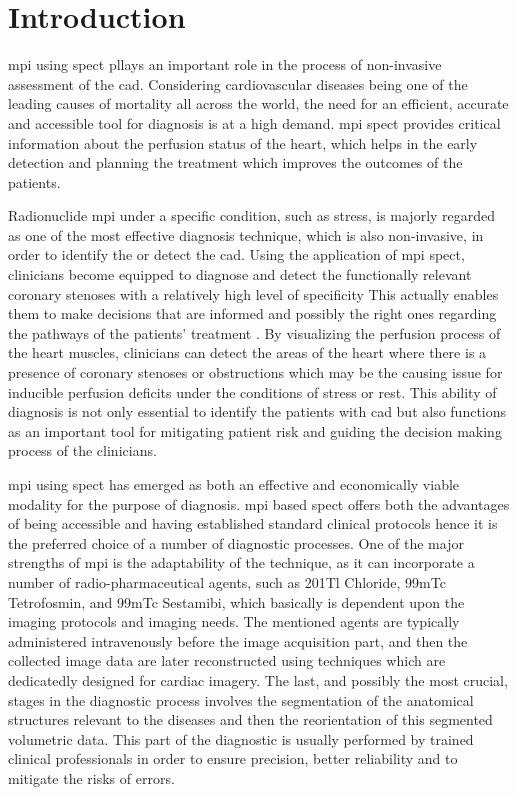 \chapter{Introduction}
\label{ch:intro}

\gls{mpi} using \gls{spect} pllays an important role in the process of non-invasive assessment of the \gls{cad}. Considering cardiovascular diseases being one of the leading causes of mortality all across the world, the need for an efficient, accurate and accessible tool for diagnosis is at a high demand. \gls{mpi} \gls{spect} provides critical information about the perfusion status of the heart, which helps in the early detection and planning the treatment which improves the outcomes of the patients.

Radionuclide \gls{mpi} under a specific condition, such as stress, is majorly regarded as one of the most effective diagnosis technique, which is also non-invasive, in order to identify the or detect the \gls{cad}. Using the application of \gls{mpi} \gls{spect}, clinicians become equipped to diagnose and detect the functionally relevant coronary stenoses with a relatively high level of specificity This actually enables them to make decisions that are informed and possibly the right ones regarding the pathways of the patients' treatment \cite{10.1001/jamacardio.2017.2471}. By visualizing the perfusion process of the heart muscles, clinicians can detect the areas of the heart where there is a presence of coronary stenoses or obstructions which may be the causing issue for inducible perfusion deficits under the conditions of stress or rest. This ability of diagnosis is not only essential to identify the patients with \gls{cad} but also functions as an important tool for mitigating patient risk and guiding the decision making process of the clinicians.

\gls{mpi} using \gls{spect} has emerged as both an effective and economically viable modality for the purpose of diagnosis. \gls{mpi} based \gls{spect} offers both the advantages of being accessible and having established standard clinical protocols hence it is the preferred choice of a number of diagnostic processes. One of the major strengths of \gls{mpi} is the adaptability of the technique, as it can incorporate a number of radio-pharmaceutical agents, such as 201Tl Chloride, 99mTc Tetrofosmin, and 99mTc Sestamibi, which basically is dependent upon the imaging protocols and imaging needs. The mentioned agents are typically administered intravenously before the image acquisition part, and then the collected image data are later reconstructed using techniques which are dedicatedly designed for cardiac imagery. The last, and possibly the most crucial, stages in the diagnostic process involves the segmentation of the anatomical structures relevant to the diseases and then the reorientation of this segmented volumetric data. This part of the diagnostic is usually performed by trained clinical professionals in order to ensure precision, better reliability and to mitigate the risks of errors.

